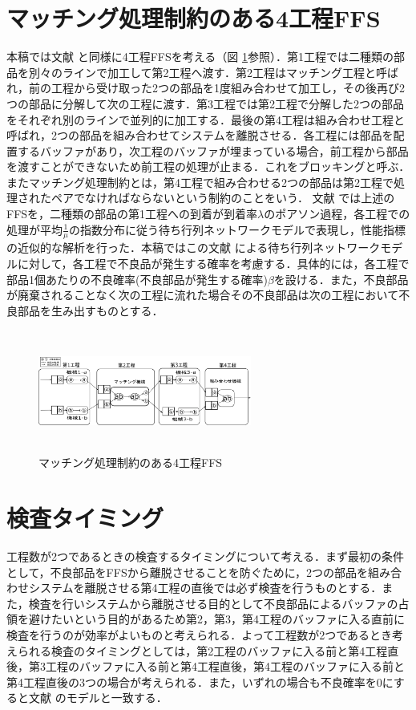 \documentclass{iseman}
\begin{document}
\section{マッチング処理制約のある4工程FFS}
本稿では文献 \cite{1} と同様に4工程FFSを考える（図 \ref{fig:model}参照）．第1工程では二種類の部品を別々のラインで加工して第2工程へ渡す．第2工程はマッチング工程と呼ばれ，前の工程から受け取った2つの部品を1度組み合わせて加工し，その後再び2つの部品に分解して次の工程に渡す．第3工程では第2工程で分解した2つの部品をそれぞれ別のラインで並列的に加工する．最後の第4工程は組み合わせ工程と呼ばれ，2つの部品を組み合わせてシステムを離脱させる．各工程には部品を配置するバッファがあり，次工程のバッファが埋まっている場合，前工程から部品を渡すことができないため前工程の処理が止まる．これをブロッキングと呼ぶ．またマッチング処理制約とは，第4工程で組み合わせる2つの部品は第2工程で処理されたペアでなければならないという制約のことをいう．
文献 \cite{1} では上述のFFSを，二種類の部品の第1工程への到着が到着率$\lambda$のポアソン過程，各工程での処理が平均$\frac{1}{\mu}$の指数分布に従う待ち行列ネットワークモデルで表現し，性能指標の近似的な解析を行った．本稿ではこの文献 \cite{1} による待ち行列ネットワークモデルに対して，各工程で不良品が発生する確率を考慮する．具体的には，各工程で部品1個あたりの不良確率(不良部品が発生する確率)$\beta$を設ける．また，不良部品が廃棄されることなく次の工程に流れた場合その不良部品は次の工程において不良部品を生み出すものとする．

\begin{figure}[t]
	\begin{center}
		\includegraphics[clip, width=7.0cm, height = 4.0cm]{model_ver5.eps}
	\end{center}
	\caption{マッチング処理制約のある4工程FFS}
	\label{fig:model}
\end{figure}

\section{検査タイミング}
工程数が2つであるときの検査するタイミングについて考える．まず最初の条件として，不良部品をFFSから離脱させることを防ぐために，2つの部品を組み合わせシステムを離脱させる第4工程の直後では必ず検査を行うものとする．また，検査を行いシステムから離脱させる目的として不良部品によるバッファの占領を避けたいという目的があるため第2，第3，第4工程のバッファに入る直前に検査を行うのが効率がよいものと考えられる．よって工程数が2つであるとき考えられる検査のタイミングとしては，第2工程のバッファに入る前と第4工程直後，第3工程のバッファに入る前と第4工程直後，第4工程のバッファに入る前と第4工程直後の3つの場合が考えられる．また，いずれの場合も不良確率を0にすると文献 \cite{1} のモデルと一致する．
\end{document}
